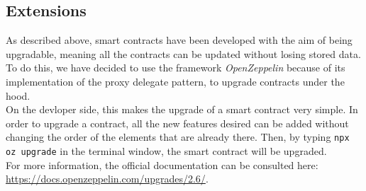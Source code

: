 \subsection{Extensions}  %
As described above, smart contracts have been developed with the aim of being upgradable, meaning all the contracts can be updated without losing stored data. \\
To do this, we have decided to use the framework \textit{OpenZeppelin} because of its implementation of the proxy delegate pattern, to upgrade contracts under the hood. \\
On the devloper side, this makes the upgrade of a smart contract very simple. In order to upgrade a contract, all the new features desired can be added without changing the order of the elements that are already there. Then, by typing \texttt{npx oz upgrade} in the terminal window, the smart contract will be upgraded. \\
For more information, the official documentation can be consulted here: \url{https://docs.openzeppelin.com/upgrades/2.6/}.
